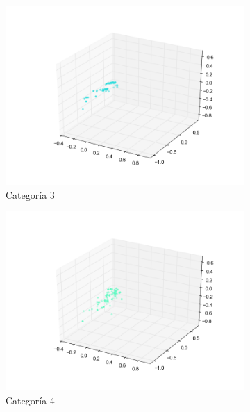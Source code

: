 \begin{figure}[H]
\begin{subfigure}[b]{0.33\textwidth}
                \includegraphics[width=\linewidth]{secciones/graficos/sanger/categoria_3.png}
                \caption{Categoría 3}
                \label{fig: ej1_sanger_categoria_3}
        \end{subfigure}
        \begin{subfigure}[b]{0.33\textwidth}
                \includegraphics[width=\linewidth]{secciones/graficos/sanger/categoria_4.png}
                \caption{Categoría 4}
                \label{fig: ej1_sanger_categoria_4}
        \end{subfigure}
        \begin{subfigure}[b]{0.33\textwidth}

\end{subfigure}
\end{figure}

